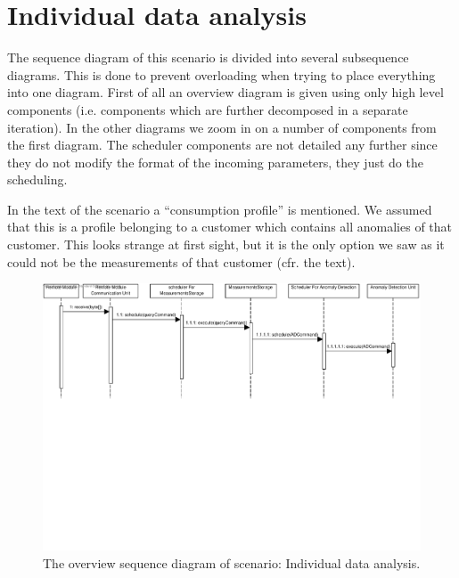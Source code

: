 \section{Individual data analysis}
\label{scenario:data-analysis}

\npar The sequence diagram of this scenario is divided into several subsequence
diagrams. This is done to prevent overloading when trying to place everything
into one diagram. First of all an overview diagram is given using only high
level components (i.e. components which are further decomposed in a separate
iteration). In the other diagrams we zoom in on a number of components from the
first diagram. The scheduler components are not detailed any further since they
do not modify the format of the incoming parameters, they just do the
scheduling.

\npar In the text of the scenario a ``consumption profile'' is mentioned. We
assumed that this is a profile belonging to a customer which contains all
anomalies of that customer. This looks strange at first sight, but it is the
only option we saw as it could not be the measurements of that customer (cfr.
the text).

\begin{figure}[H]
	\begin{centering}
		\includegraphics[width=\textwidth]{figs/scenario-5-6.pdf}
		\caption{The overview sequence diagram of scenario: Individual data analysis.}
		\label{fig:scenario-5-6}
	\end{centering}
\end{figure}

